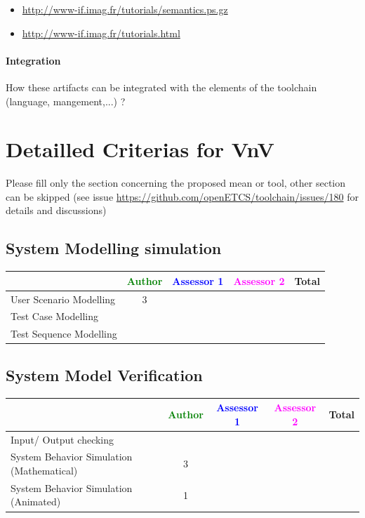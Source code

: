 	\begin{itemize}
		\item \url{http://www-if.imag.fr/tutorials/semantics.ps.gz}
		\item \url{http://www-if.imag.fr/tutorials.html}
	\end{itemize}



\paragraph{Integration}
    How these artifacts can be integrated with the elements of the toolchain (language, mangement,...) ?


\section{Detailled Criterias for VnV}

Please  fill only the section concerning the proposed mean or tool, other section can be skipped (see issue \url{https://github.com/openETCS/toolchain/issues/180} for details and discussions)



\subsection{System Modelling simulation}	

\begin{tabular}{|l | c | c | c | c|}
\hline
& \textcolor{green}{Author} & \textcolor{blue}{Assessor 1} & \textcolor{magenta}{Assessor 2} & Total \\
\hline 
User Scenario Modelling & 3 & & &  \\
\hline
Test Case Modelling & & & &  \\
\hline
Test Sequence Modelling & & & &  \\
\hline
\end{tabular}
	
\subsection{System Model Verification}	


\begin{tabular}{|l | c | c | c | c|}
\hline
& \textcolor{green}{Author} & \textcolor{blue}{Assessor 1} & \textcolor{magenta}{Assessor 2} & Total \\
\hline 
Input/ Output checking & & & &  \\
\hline
System Behavior Simulation (Mathematical) & 3 & & &  \\
\hline
System Behavior Simulation (Animated) & 1 & & &  \\
\hline
\end{tabular}


